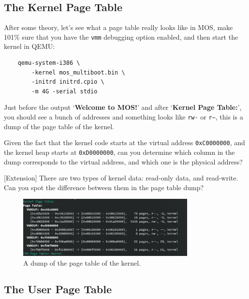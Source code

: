 \subsection{The Kernel Page Table}

After some theory, let's see what a page table really looks like in MOS, make
101\% sure that you have the \texttt{vmm} debugging option enabled, and then start
the kernel in QEMU:

\begin{verbatim}
    qemu-system-i386 \
        -kernel mos_multiboot.bin \
        -initrd initrd.cpio \
        -m 4G -serial stdio
\end{verbatim}

\begin{exercise}
    \item Just before the output `\textbf{Welcome to MOS!}' and after
    `\textbf{Kernel Page Table:}', you should see a bunch of addresses and
    something looks like \texttt{rw-} or \texttt{r--}, this is a dump of the
    page table of the kernel.

    \item Given the fact that the kernel code starts at the virtual address
    \texttt{0xC0000000}, and the kernel heap starts at \texttt{0xD0000000},
    can you determine which column in the dump corresponds to the virtual
    address, and which one is the physical address?

    \item{} [Extension] There are two types of kernel data: read-only data,
    and read-write. Can you spot the difference between them in the page table dump?
\end{exercise}

\begin{figure}[htbp]
    \centering
    \includegraphics[width=0.8\textwidth]{assets/c4.page-table-dump.png}
    \caption{A dump of the page table of the kernel.}
    \label{fig:mm_dump_pagetable}
\end{figure}

\subsection{The User Page Table}

